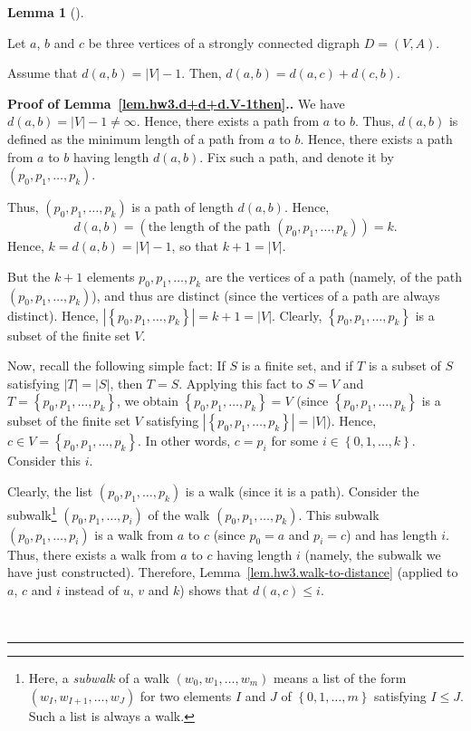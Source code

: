 \documentclass[numbers=enddot,12pt,final,onecolumn,notitlepage]{scrartcl}%
\theoremstyle{definition}
\newtheorem{lem}[theo]{Lemma}
\newenvironment{lemma}[1][]
{\begin{lem}[#1]\begin{leftbar}}
{\end{leftbar}\end{lem}}
\newenvironment{proof}[1][Proof]{\noindent\textbf{#1.} }{\ \rule{0.5em}{0.5em}}
\newcommand{\set}[1]{\left\{ #1 \right\}}
\newcommand{\abs}[1]{\left| #1 \right|}
\newcommand{\tup}[1]{\left( #1 \right)}
\begin{document}
\begin{lemma} \label{lem.hw3.d+d+d.V-1then}
Let $a$, $b$ and $c$ be three vertices of a strongly connected
digraph $D = \tup{V, A}$.

Assume that $d \tup{a, b} = \abs{V} - 1$.
Then, $d \tup{a, b} = d \tup{a, c} + d \tup{c, b}$.
\end{lemma}

\begin{proof}[Proof of Lemma~\ref{lem.hw3.d+d+d.V-1then}.]
We have $d \tup{a, b} = \abs{V} - 1 \neq \infty$.
Hence, there exists a path from $a$ to $b$.
Thus, $d \tup{a, b}$ is defined as the minimum length of a path from
$a$ to $b$.
Hence, there exists a path from $a$ to $b$ having length
$d \tup{a, b}$.
Fix such a path, and denote it by $\tup{p_0, p_1, \ldots, p_k}$.

Thus, $\tup{p_0, p_1, \ldots, p_k}$ is a path of length
$d \tup{a, b}$.
Hence,
\[
d \tup{a, b}
= \tup{\text{the length of the path } \tup{p_0, p_1, \ldots, p_k} }
= k .
\]
Hence, $k = d \tup{a, b} = \abs{V} - 1$, so that $k + 1 = \abs{V}$.

But the $k+1$ elements $p_0, p_1, \ldots, p_k$ are the vertices of a
path (namely, of the path $\tup{p_0, p_1, \ldots, p_k}$), and thus are
distinct (since the vertices of a path are always distinct).
Hence, $\abs{\set{p_0, p_1, \ldots, p_k}} = k + 1 = \abs{V}$.
Clearly, $\set{p_0, p_1, \ldots, p_k}$ is a subset of the finite set
$V$.

Now, recall the following simple fact:
If $S$ is a finite set, and if $T$ is a subset of $S$ satisfying
$\abs{T} = \abs{S}$, then $T = S$.
Applying this fact to $S = V$ and $T = \set{p_0, p_1, \ldots, p_k}$,
we obtain $\set{p_0, p_1, \ldots, p_k} = V$
(since $\set{p_0, p_1, \ldots, p_k}$ is a subset of the finite set
$V$ satisfying $\abs{\set{p_0, p_1, \ldots, p_k}} = \abs{V}$).
Hence, $c \in V = \set{p_0, p_1, \ldots, p_k}$.
In other words, $c = p_i$ for some $i \in \set{0, 1, \ldots, k}$.
Consider this $i$.

Clearly, the list $\tup{p_0, p_1, \ldots, p_k}$ is a walk (since
it is a path).
Consider the
subwalk\footnote{Here, a \textit{subwalk} of a walk
  $\tup{w_0, w_1, \ldots, w_m}$ means a list of the form
  $\tup{w_I, w_{I+1}, \ldots, w_J}$
  for two elements $I$ and $J$ of $\set{0, 1, \ldots, m}$
  satisfying $I \leq J$.
  Such a list is always a walk.}
$\tup{p_0, p_1, \ldots, p_i}$ of the walk
$\tup{p_0, p_1, \ldots, p_k}$.
This subwalk $\tup{p_0, p_1, \ldots, p_i}$ is a walk from $a$ to $c$
(since $p_0 = a$ and $p_i = c$) and has length $i$.
Thus, there exists a walk from $a$ to $c$ having length $i$
(namely, the subwalk we have just constructed).
Therefore, Lemma~\ref{lem.hw3.walk-to-distance} (applied to $a$, $c$
and $i$ instead of $u$, $v$ and $k$) shows that
$d \tup{a, c} \leq i$.


\end{proof}
\end{document}
